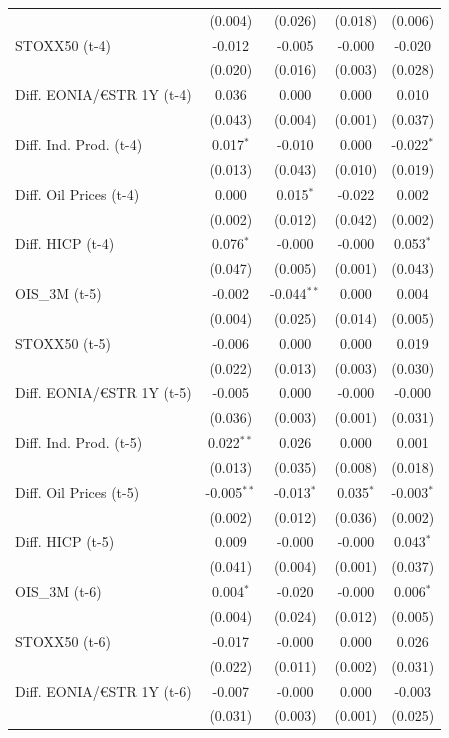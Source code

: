 \begin{longtable}[t]{lcccc}
 & (0.004) & (0.026) & (0.018) & (0.006)\\
STOXX50 (t-4) & -0.012 & -0.005 & -0.000 & -0.020\\
 & (0.020) & (0.016) & (0.003) & (0.028)\\
Diff. EONIA/€STR 1Y (t-4) & 0.036 & 0.000 & 0.000 & 0.010\\
 & (0.043) & (0.004) & (0.001) & (0.037)\\
Diff. Ind. Prod. (t-4) & 0.017$^{*}$ & -0.010 & 0.000 & -0.022$^{*}$\\
 & (0.013) & (0.043) & (0.010) & (0.019)\\
Diff. Oil Prices (t-4) & 0.000 & 0.015$^{*}$ & -0.022 & 0.002\\
 & (0.002) & (0.012) & (0.042) & (0.002)\\
Diff. HICP (t-4) & 0.076$^{*}$ & -0.000 & -0.000 & 0.053$^{*}$\\
 & (0.047) & (0.005) & (0.001) & (0.043)\\
OIS\_3M (t-5) & -0.002 & -0.044$^{**}$ & 0.000 & 0.004\\
 & (0.004) & (0.025) & (0.014) & (0.005)\\
STOXX50 (t-5) & -0.006 & 0.000 & 0.000 & 0.019\\
 & (0.022) & (0.013) & (0.003) & (0.030)\\
Diff. EONIA/€STR 1Y (t-5) & -0.005 & 0.000 & -0.000 & -0.000\\
 & (0.036) & (0.003) & (0.001) & (0.031)\\
Diff. Ind. Prod. (t-5) & 0.022$^{**}$ & 0.026 & 0.000 & 0.001\\
 & (0.013) & (0.035) & (0.008) & (0.018)\\
Diff. Oil Prices (t-5) & -0.005$^{**}$ & -0.013$^{*}$ & 0.035$^{*}$ & -0.003$^{*}$\\
 & (0.002) & (0.012) & (0.036) & (0.002)\\
Diff. HICP (t-5) & 0.009 & -0.000 & -0.000 & 0.043$^{*}$\\
 & (0.041) & (0.004) & (0.001) & (0.037)\\
OIS\_3M (t-6) & 0.004$^{*}$ & -0.020 & -0.000 & 0.006$^{*}$\\
 & (0.004) & (0.024) & (0.012) & (0.005)\\
STOXX50 (t-6) & -0.017 & -0.000 & 0.000 & 0.026\\
 & (0.022) & (0.011) & (0.002) & (0.031)\\
Diff. EONIA/€STR 1Y (t-6) & -0.007 & -0.000 & 0.000 & -0.003\\
 & (0.031) & (0.003) & (0.001) & (0.025)\\

\end{longtable}
